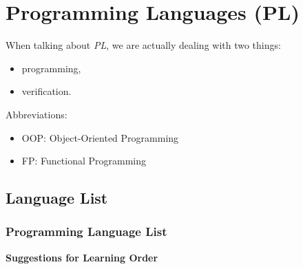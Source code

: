 \documentclass{article}
\begin{document}
\section{Programming Languages (PL)}

When talking about \emph{PL}, we are actually dealing with two things:
\begin{itemize}
    \item programming,
    \item verification.
\end{itemize}

\noindent Abbreviations:
\begin{itemize}
    \item OOP: Object-Oriented Programming
    \item FP: Functional Programming
\end{itemize}

\subsection{Language List}

\subsubsection{Programming Language List}

\textbf{Suggestions for Learning Order}
\end{document}
